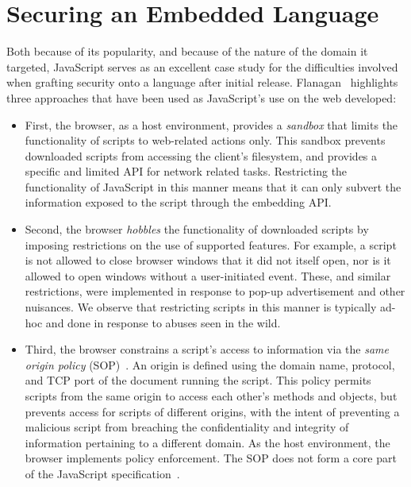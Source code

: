 \documentclass[preprint]{sigplanconf}
\begin{document}

\section{Securing an Embedded Language}
\label{sec:javascript-security}

Both because of its popularity, and because of the nature of the domain it targeted, JavaScript serves as an excellent case study for the difficulties involved when grafting security onto a language after initial release.
Flanagan~\cite{flanagan2011javascript} highlights three approaches that have been used as JavaScript's use on the web developed:

\begin{itemize}
\item{
First, the browser, as a host environment, provides a \emph{sandbox} that limits the functionality of scripts to web-related actions only.
This sandbox prevents downloaded scripts from accessing the client's filesystem, and provides a specific and limited API for network related tasks.
Restricting the functionality of JavaScript in this manner means that it can only subvert the information exposed to the script through the embedding API.}

\item{
Second, the browser \emph{hobbles} the functionality of downloaded scripts by imposing restrictions on the use of supported features.
For example, a script is not allowed to close browser windows that it did not itself open, nor is it allowed to open windows without a user-initiated event.
These, and similar restrictions, were implemented in response to pop-up advertisement and other nuisances.
We observe that restricting scripts in this manner is typically ad-hoc and done in response to abuses seen in the wild.}

\item{
Third, the browser constrains a script's access to information via the \emph{same origin policy} (SOP)~\cite{sop}.
An origin is defined using the domain name, protocol, and TCP port of the document running the script.
This policy permits scripts from the same origin to access each other's methods and objects, but prevents access for scripts of different origins, with the intent of preventing a malicious script from breaching the confidentiality and integrity of information pertaining to a different domain.
As the host environment, the browser implements policy enforcement.
The SOP does not form a core part of the JavaScript specification~\cite{ecma}.}
\end{itemize}
\end{document}
